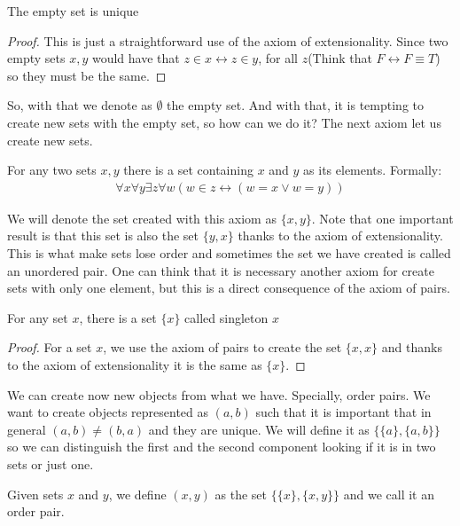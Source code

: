 \documentclass{tufte-handout}
\begin{document}
\begin{theorem}
	The empty set is unique
\end{theorem}
\begin{proof}
	This is just a straightforward use of the axiom of extensionality. Since two empty sets $x, y$ would have that $z \in x \leftrightarrow z \in y$, for all $z$(Think that $F \leftrightarrow F \equiv T$) so they must be the same.
\end{proof}

So, with that we denote as $\emptyset$ the empty set. And with that, it is tempting to create new sets with the empty set, so how can we do it? The next axiom let us create new sets.

\begin{axiom}
	For any two sets $x, y$ there is a set containing $x$ and $y$ as its elements. Formally:
	\begin{align*}
		\forall x \forall y \exists z \forall w(w \in z \leftrightarrow (w = x \vee w = y))
	\end{align*}
\end{axiom}

We will denote the set created with this axiom as $\{x, y\}$. Note that one important result is that this set is also the set $\{y, x\}$ thanks to the axiom of extensionality. This is what make sets lose order and sometimes the set we have created is called an unordered pair. One can think that it is necessary another axiom for create sets with only one element, but this is a direct consequence of the axiom of pairs.

\begin{theorem}
	For any set $x$, there is a set $\{x\}$ called singleton $x$
\end{theorem}
\begin{proof}
	For a set $x$, we use the axiom of pairs to create the set $\{x, x\}$ and thanks to the axiom of extensionality it is the same as $\{x\}$.
\end{proof}

We can create now new objects from what we have. Specially, order pairs. We want to create objects represented as $(a, b)$ such that it is important that in general $(a, b) \neq (b, a)$ and they are unique. We will define it as $\{\{a\}, \{a, b\}\}$ so we can distinguish the first and the second component looking if it is in two sets or just one.

\begin{definition}
	Given sets $x$ and $y$, we define $(x, y)$ as the set $\{\{x\}, \{x, y\}\}$ and we call it an order pair.
\end{definition}
\end{document}
